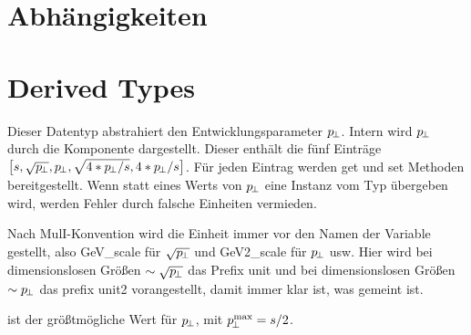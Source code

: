 \section{Abhängigkeiten}
\section{Derived Types}
Dieser Datentyp abstrahiert den Entwicklungsparameter $p_{\!\perp}$. Intern wird $p_{\!\perp}$ durch die Komponente  dargestellt. Dieser enthält die fünf Einträge $\big[s, \sqrt{p_{\!\perp}}, p_{\!\perp}, \sqrt{4*p_{\!\perp}/s}, 4*p_{\!\perp}/s\big]$. Für jeden Eintrag werden get und set Methoden bereitgestellt. Wenn statt eines Werts von $p_{\!\perp}$ eine Instanz vom Typ  übergeben wird, werden Fehler durch falsche Einheiten vermieden.

Nach MulI-Konvention wird die Einheit immer vor den Namen der Variable gestellt, also GeV\_scale für $\sqrt{p_{\!\perp}}$ und GeV2\_scale für $p_{\!\perp}$ usw. Hier wird bei dimensionslosen Größen $\sim\sqrt{p_{\!\perp}}$ das Prefix unit und bei dimensionslosen Größen $\sim p_{\!\perp}$ das prefix unit2 vorangestellt, damit immer klar ist, was gemeint ist.

 ist der größtmögliche Wert für $p_{\!\perp}$, mit $p_{\!\perp}^{\max}=s/2$.


